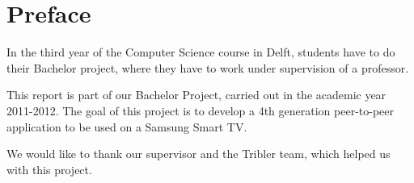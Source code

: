 \chapter*{Preface}
In the third year of the Computer Science course in Delft, students have to do their Bachelor project, 
where they have to work under supervision of a professor.

This report is part of our Bachelor Project, carried out in the academic year 2011-2012. The goal of this project is to develop a 4th generation peer-to-peer application to be used on a Samsung Smart TV.

We would like to thank our supervisor and the Tribler team, which helped us with this project.